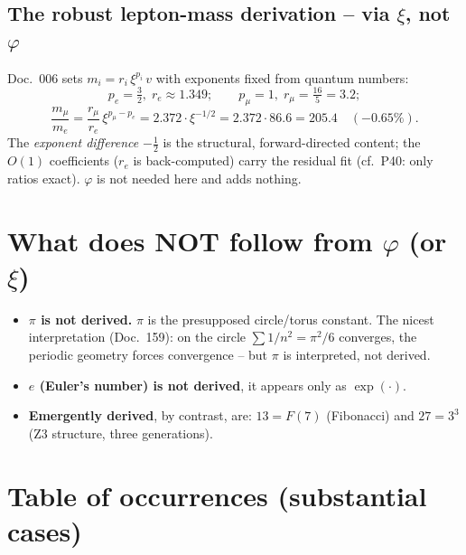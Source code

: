 \subsection{The robust lepton-mass derivation -- via $\xi$, not
$\varphi$}\label{sec:masse}
Doc.~006 sets $m_i = r_i\,\xi^{p_i}\,v$ with exponents fixed from quantum
numbers:
\begin{equation}
  p_e = \tfrac32,\; r_e\approx 1.349; \qquad
  p_\mu = 1,\; r_\mu = \tfrac{16}{5} = 3.2;
\end{equation}
\begin{equation}
  \frac{m_\mu}{m_e} = \frac{r_\mu}{r_e}\,\xi^{p_\mu-p_e}
  = 2.372\cdot\xi^{-1/2} = 2.372\cdot86.6 = 205.4 \quad(-0.65\%).
\end{equation}
The \emph{exponent difference} $-\tfrac12$ is the structural, forward-directed
content; the $O(1)$ coefficients ($r_e$ is back-computed) carry the residual
fit (cf.\ P40: only ratios exact). $\varphi$ is not needed here and adds
nothing.

\section{What does NOT follow from $\varphi$ (or $\xi$)}

\begin{itemize}
  \item \textbf{$\pi$ is not derived.} $\pi$ is the presupposed circle/torus
        constant. The nicest interpretation (Doc.~159): on the circle
        $\sum 1/n^2=\pi^2/6$ converges, the periodic geometry forces
        convergence -- but $\pi$ is interpreted, not derived.
  \item \textbf{$e$ (Euler's number) is not derived}, it appears only as
        $\exp(\cdot)$.
  \item \textbf{Emergently derived}, by contrast, are: $13=F(7)$ (Fibonacci)
        and $27=3^3$ (Z3 structure, three generations).
\end{itemize}

\section{Table of occurrences (substantial cases)}

